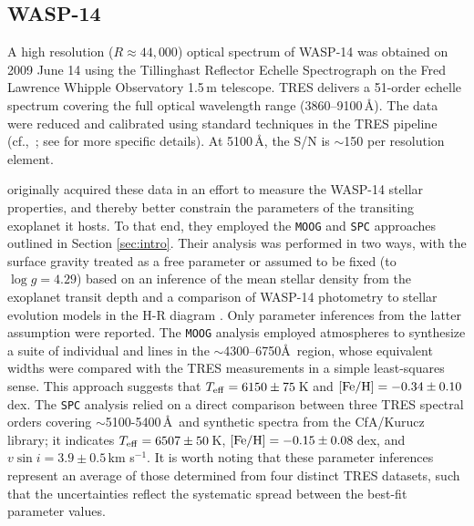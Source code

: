 \documentclass[iop,floatfix]{emulateapj}
\newcommand{\comm}[1]{ \textcolor{red}{SA: #1}}
\begin{document}
\subsection{WASP-14} \label{subsec:wasp}

A high resolution ($R\approx44,000$) optical spectrum of WASP-14 was obtained on 2009 June 14 
using the Tillinghast Reflector Echelle Spectrograph \citep[TRES;][]{furesz08} on the Fred Lawrence 
Whipple Observatory 1.5\,m telescope.  TRES delivers a 51-order echelle spectrum covering the 
full optical wavelength range (3860--9100\,\AA).  The data were reduced and calibrated using 
standard techniques in the TRES pipeline (cf.,~\citealt{buchhave10}; see \citealt{torres12} for 
more specific details).  At 5100\,\AA, the S/N is $\sim$150 per resolution element.  

\citet{torres12} originally acquired these data in an effort to measure the WASP-14 stellar 
properties, and thereby better constrain the parameters of the transiting exoplanet it hosts.  To 
that end, they employed the {\tt MOOG} and {\tt SPC} approaches outlined in Section 
\ref{sec:intro}.  Their analysis was performed in two ways, with the surface gravity treated as a 
free parameter or assumed to be fixed (to $\log g = 4.29$) based on an inference of the mean 
stellar density from the exoplanet transit depth and a comparison of WASP-14 photometry to stellar 
evolution models in the H-R diagram \citep{joshi09}.  Only parameter inferences from the latter 
assumption were reported.  The {\tt MOOG} analysis employed \citet{kurucz93} atmospheres to 
synthesize a suite of individual  and  lines in the $\sim$4300--6750\AA\ 
region, whose equivalent widths were compared with the TRES measurements in a simple least-squares 
sense.  This approach suggests that $T_{\rm eff} = 6150\pm75$\,K and $[{\rm Fe/H}] = 
-0.34\pm0.10$\,dex.  The {\tt SPC} analysis relied on a direct comparison between three TRES 
spectral orders covering $\sim$5100-5400\,\AA\ and synthetic spectra from the {\sc CfA/Kurucz} 
library; it indicates $T_{\rm eff} = 6507\pm50$\,K, $[{\rm Fe/H}] = -0.15\pm0.08$\,dex, and $v \sin 
i = 3.9\pm0.5$\,km s$^{-1}$.  It is worth noting that these parameter inferences represent an 
average of those determined from four distinct TRES datasets, such that the uncertainties reflect 
the systematic spread between the best-fit parameter values. 
\end{document}
